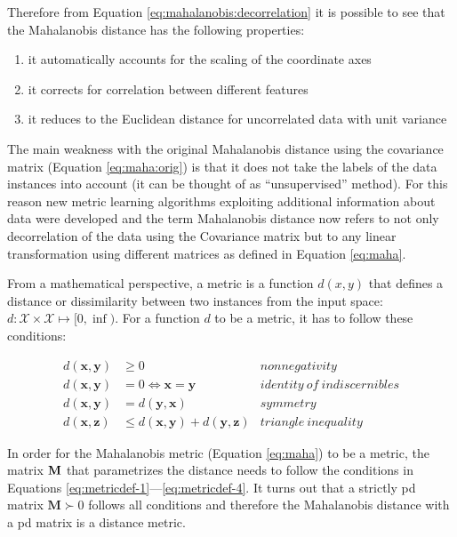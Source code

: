 \documentclass[12pt,a4paper]{report}
\begin{document}
Therefore from Equation \ref{eq:mahalanobis:decorrelation} it is possible to see that the Mahalanobis distance has the following properties:
\begin{enumerate}
\item it automatically accounts for the scaling of the coordinate axes
\item it corrects for correlation between different features
\item it reduces to the Euclidean distance for uncorrelated data with unit variance
\end{enumerate}

The main weakness with the original Mahalanobis distance using the covariance matrix (Equation \ref{eq:maha:orig}) is that it does not take the labels of the data instances into account (it can be thought of as ``unsupervised'' method). For this reason new metric learning algorithms exploiting additional information about data were developed and the term Mahalanobis distance now refers to not only decorrelation of the data using the Covariance matrix but to any linear transformation using different matrices as defined in Equation \ref{eq:maha}.

From a mathematical perspective, a metric is a function $d(x,y)$ that defines a distance or dissimilarity between two instances from the input space: $d:\mathcal{X} \times \mathcal{X} \mapsto [0,\inf)$. For a function $d$ to be a metric, it has to follow these conditions:

\begin{align}
d(\textbf{x},\textbf{y}) &\geq 0 & nonnegativity \label{eq:metricdef-1} \\
d(\textbf{x},\textbf{y}) &= 0 \iff \textbf{x}=\textbf{y} & identity \ of \ indiscernibles \label{eq:metricdef-2} \\
d(\textbf{x},\textbf{y}) &= d(\textbf{y},\textbf{x}) & symmetry \label{eq:metricdef-3} \\
d(\textbf{x},\textbf{z}) &\leq d(\textbf{x},\textbf{y}) + d(\textbf{y},\textbf{z}) & triangle \ inequality \label{eq:metricdef-4}
\end{align} 

In order for the Mahalanobis metric (Equation \ref{eq:maha}) to be a metric, the matrix $\bf{M}$ that parametrizes the distance needs to follow the conditions in Equations \ref{eq:metricdef-1}---\ref{eq:metricdef-4}. It turns out that a strictly \ac{pd} matrix $\bm{M} \succ 0$ follows all conditions and therefore the Mahalanobis distance with a \ac{pd} matrix is a distance metric.
\end{document}
